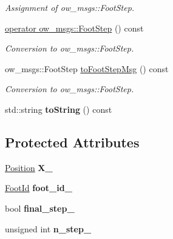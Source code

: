 \begin{DoxyCompactItemize}
\begin{DoxyCompactList}\small\item\em Assignment of ow\+\_\+msgs\+::\+Foot\+Step. \end{DoxyCompactList}\item 
\hyperlink{classow__core_1_1FootStep_ab84d8ab04e603638637a91d77b82f63a}{operator ow\+\_\+msgs\+::\+Foot\+Step} () const \hypertarget{classow__core_1_1FootStep_ab84d8ab04e603638637a91d77b82f63a}{}\label{classow__core_1_1FootStep_ab84d8ab04e603638637a91d77b82f63a}

\begin{DoxyCompactList}\small\item\em Conversion to ow\+\_\+msgs\+::\+Foot\+Step. \end{DoxyCompactList}\item 
ow\+\_\+msgs\+::\+Foot\+Step \hyperlink{classow__core_1_1FootStep_aa38aad0e69db2fc2f402f76cbcb3f312}{to\+Foot\+Step\+Msg} () const \hypertarget{classow__core_1_1FootStep_aa38aad0e69db2fc2f402f76cbcb3f312}{}\label{classow__core_1_1FootStep_aa38aad0e69db2fc2f402f76cbcb3f312}

\begin{DoxyCompactList}\small\item\em Conversion to ow\+\_\+msgs\+::\+Foot\+Step. \end{DoxyCompactList}\item 
std\+::string {\bfseries to\+String} () const \hypertarget{classow__core_1_1FootStep_a15e848a2502ac1c26786585635dceb1b}{}\label{classow__core_1_1FootStep_a15e848a2502ac1c26786585635dceb1b}

\end{DoxyCompactItemize}
\subsection*{Protected Attributes}
\begin{DoxyCompactItemize}
\item 
\hyperlink{classow__core_1_1CartesianPosition}{Position} {\bfseries X\+\_\+}\hypertarget{classow__core_1_1FootStep_a6c0c611ffa3396988c3cf8ba7d850963}{}\label{classow__core_1_1FootStep_a6c0c611ffa3396988c3cf8ba7d850963}

\item 
\hyperlink{foot__id_8h_a57e66d30579b22cfe2c17c739278e5a6}{Foot\+Id} {\bfseries foot\+\_\+id\+\_\+}\hypertarget{classow__core_1_1FootStep_a65f656d98a4f1eb015347e73e6488891}{}\label{classow__core_1_1FootStep_a65f656d98a4f1eb015347e73e6488891}

\item 
bool {\bfseries final\+\_\+step\+\_\+}\hypertarget{classow__core_1_1FootStep_acf30e0d18632019cd690cd65476aab95}{}\label{classow__core_1_1FootStep_acf30e0d18632019cd690cd65476aab95}

\item 
unsigned int {\bfseries n\+\_\+step\+\_\+}\hypertarget{classow__core_1_1FootStep_ab47ca9d067a02e35a29c0c3680987aaa}{}\label{classow__core_1_1FootStep_ab47ca9d067a02e35a29c0c3680987aaa}

\end{DoxyCompactItemize}


